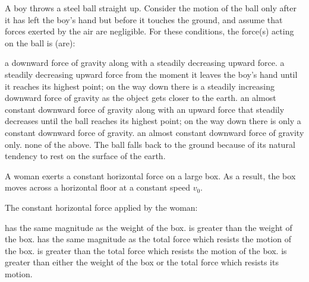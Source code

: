 \documentclass[12pt]{exam}
\begin{document}
\begin{questions}

\question
A boy throws a steel ball straight up. Consider the motion of the ball only after it has left the boy's hand but before it touches the ground, and assume that forces exerted by the air are negligible. For these conditions, the force(s) acting on the ball is (are):
\begin{choices}
\choice a downward force of gravity along with a steadily decreasing upward force.
\choice a steadily decreasing upward force from the moment it leaves the boy's hand until it reaches its highest point; on the way down there is a steadily increasing downward force of gravity as the object gets closer to the earth.
\choice an almost constant downward force of gravity along with an upward force that steadily decreases until the ball reaches its highest point; on the way down there is only a constant downward force of gravity.
\choice an almost constant downward force of gravity only.
\choice none of the above. The ball falls back to the ground because of its natural tendency to rest on the surface of the earth.
\end{choices}
\question
\label{ques:25}
A woman exerts a constant horizontal force on a large box. As a result, the box moves across a horizontal floor at a constant speed $v_0$.

The constant horizontal force applied by the woman:
\begin{choices}
\choice has the same magnitude as the weight of the box.
\choice is greater than the weight of the box.
\choice has the same magnitude as the total force which resists the motion of the box.
\choice is greater than the total force which resists the motion of the box.
\choice is greater than either the weight of the box or the total force which resists its motion.
\end{choices}


\end{questions}
\end{document}
